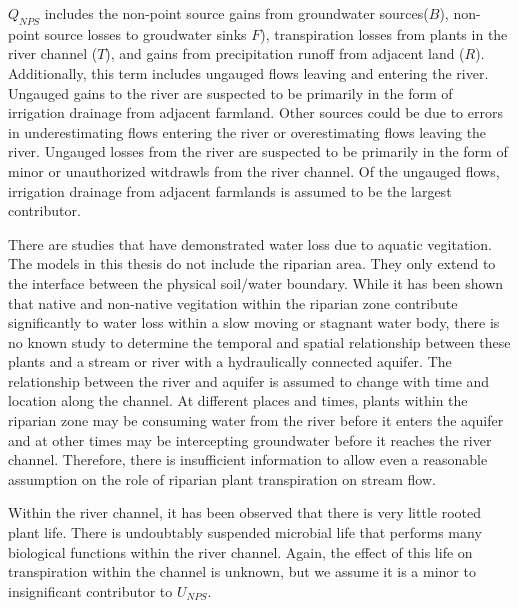 \begin{linenumbers}
$ Q_{NPS} $ includes the non-point source gains from groundwater sources($ B $), non-point source losses to groudwater sinks {}$ F $), transpiration losses from plants in the river channel ($ T $), and gains from precipitation runoff from adjacent land ($ R $).  Additionally, this term includes ungauged flows leaving and entering the river.  Ungauged gains to the river are suspected to be primarily in the form of irrigation drainage from adjacent farmland.  Other sources could be due to errors in underestimating flows entering the river or overestimating flows leaving the river.  Ungauged losses from the river are suspected to be primarily in the form of minor or unauthorized witdrawls from the river channel.  Of the ungauged flows, irrigation drainage from adjacent farmlands is assumed to be the largest contributor.

There are studies that have demonstrated water loss due to aquatic vegitation.  The models in this thesis do not include the riparian area.  They only extend to the interface between the physical soil/water boundary.  While it has been shown that native and non-native vegitation within the riparian zone contribute significantly to water loss within a slow moving or stagnant water body, there is no known study to determine the temporal and spatial relationship between these plants and a stream or river with a hydraulically connected aquifer.  The relationship between the river and aquifer is assumed to change with time and location along the channel.  At different places and times, plants within the riparian zone may be consuming water from the river before it enters the aquifer and at other times may be intercepting groundwater before it reaches the river channel.  Therefore, there is insufficient information to allow even a reasonable assumption on the role of riparian plant transpiration on stream flow.

Within the river channel, it has been observed that there is very little rooted plant life.  There is undoubtably suspended microbial life that performs many biological functions within the river channel.  Again, the effect of this life on transpiration within the channel is unknown, but we assume it is a minor to insignificant contributor to $ U_{NPS} $.


\end{linenumbers}
